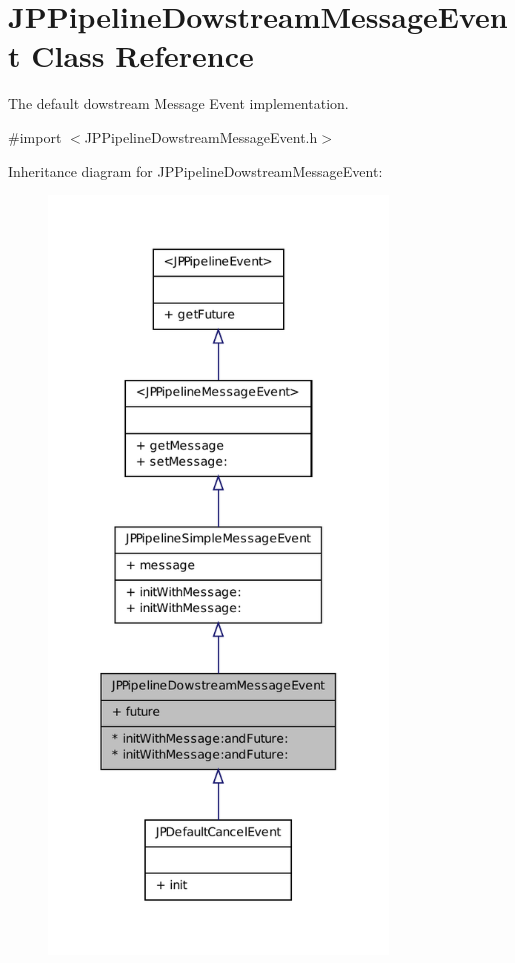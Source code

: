 \hypertarget{a00022}{
\section{JPPipelineDowstreamMessageEvent Class Reference}
\label{a00022}
}


The default dowstream Message Event implementation.  




{\ttfamily \#import $<$JPPipelineDowstreamMessageEvent.h$>$}



Inheritance diagram for JPPipelineDowstreamMessageEvent:\nopagebreak
\begin{figure}[H]
\begin{center}
\leavevmode
\includegraphics[width=256pt]{a00127}
\end{center}
\end{figure}


